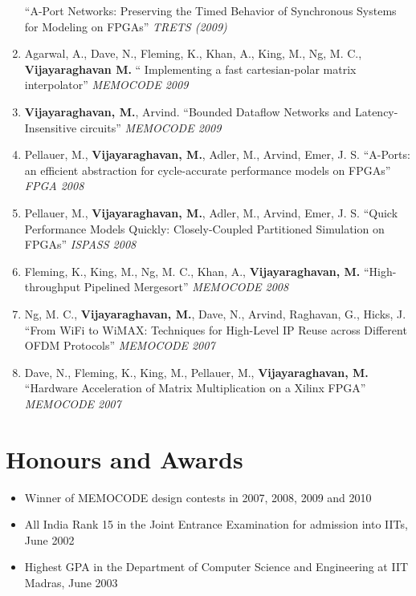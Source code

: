 \documentclass[margin,line]{resume}
\begin{document}
\begin{resume}
\begin{enumerate}
    ``A-Port Networks: Preserving the Timed Behavior of Synchronous Systems for
    Modeling on FPGAs'' \textit{TRETS (2009)}
    \item Agarwal, A., Dave, N., Fleming, K., Khan, A., King, M., Ng, M. C., \textbf{Vijayaraghavan M.} ``
    Implementing a fast cartesian-polar matrix interpolator'' \textit{MEMOCODE 2009}
    \item \textbf{Vijayaraghavan, M.}, Arvind. ``Bounded Dataflow Networks and
    Latency-Insensitive circuits'' \textit{MEMOCODE 2009}
    \item Pellauer, M.,
    \textbf{Vijayaraghavan, M.}, Adler, M., Arvind, Emer, J. S. ``A-Ports: an
    efficient abstraction for cycle-accurate performance models on FPGAs''
    \textit{FPGA 2008}
    \item Pellauer, M., \textbf{Vijayaraghavan, M.}, Adler, M., Arvind, Emer,
    J. S. ``Quick Performance Models Quickly: Closely-Coupled Partitioned
    Simulation on FPGAs'' \textit{ISPASS 2008}
    \item Fleming, K., King, M., Ng, M. C., Khan, A., \textbf{Vijayaraghavan, M.} ``High-throughput Pipelined Mergesort'' \textit{MEMOCODE 2008}
    \item Ng, M. C., \textbf{Vijayaraghavan, M.}, Dave, N., Arvind, Raghavan, G., Hicks, J. ``From WiFi to WiMAX: Techniques for High-Level IP Reuse across Different OFDM Protocols'' \textit{MEMOCODE 2007}
    \item Dave, N., Fleming, K., King, M., Pellauer, M., \textbf{Vijayaraghavan, M.} ``Hardware Acceleration of Matrix Multiplication on a Xilinx FPGA'' \textit{MEMOCODE 2007}
    \end{enumerate}

    \section{\mysidestyle Honours and Awards} 

	\begin{itemize}
  \item Winner of MEMOCODE design contests in 2007, 2008, 2009 and 2010
  \item All India Rank 15 in the Joint Entrance Examination for admission into IITs, June 2002
  \item Highest GPA in the Department of Computer Science and Engineering at IIT Madras, June 2003
  \end{itemize}


\end{resume}
\end{document}
